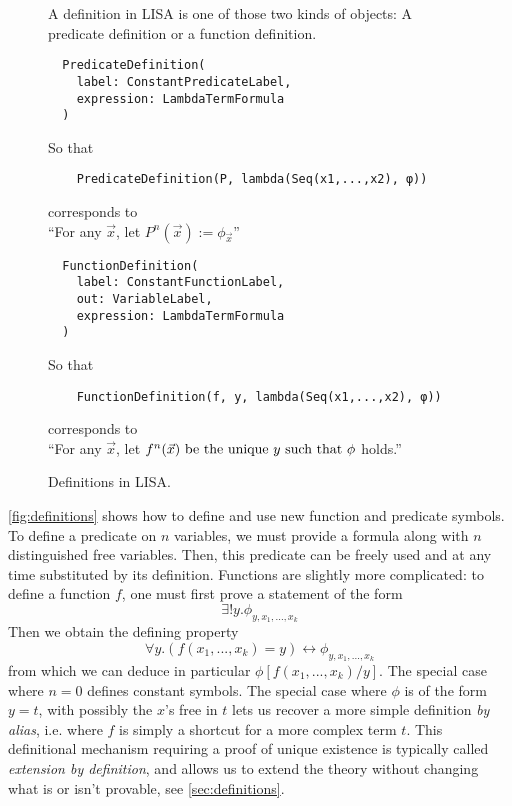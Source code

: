 \begin{figure}
  A definition in LISA is one of those two kinds of objects: A predicate definition or a function definition.
  \begin{lstlisting}
  PredicateDefinition(
    label: ConstantPredicateLabel,
    expression: LambdaTermFormula
  )
\end{lstlisting}
  So that 
  \begin{lstlisting}
    PredicateDefinition(P, lambda(Seq(x1,...,x2), φ)) 
  \end{lstlisting}
  corresponds to \\
    \hspace*{1.3em}``For any $\vec{x}$, let $P^n(\vec{x}) := \phi_{\vec{x}}$''

    \vspace*{2em}
  \begin{lstlisting}
  FunctionDefinition(
    label: ConstantFunctionLabel,
    out: VariableLabel, 
    expression: LambdaTermFormula
  )
\end{lstlisting}
So that 
  \begin{lstlisting}
    FunctionDefinition(f, y, lambda(Seq(x1,...,x2), φ)) 
  \end{lstlisting}
  corresponds to \\
    \hspace*{1.3em}``For any $\vec{x}$, let $f^n(\vec{x}) \textnormal{ be the unique } y \textnormal{ such that } \phi$ holds.''

  \caption{Definitions in LISA.}
  \label{fig:definitions}
\end{figure}

\autoref{fig:definitions} shows how to define and use new function and predicate symbols. To define a predicate on $n$ variables, we must provide a formula along with $n$ distinguished free variables. Then, this predicate can be freely used and at any time substituted by its definition. Functions are slightly more complicated: to define a function $f$, one must first prove a statement of the form
$$\exists ! y. \phi_{y, x_1,...,x_k}$$
Then we obtain the defining property
$$\forall y. (f(x_1,...,x_k)=y) \leftrightarrow \phi_{y, x_1,...,x_k}$$
from which we can deduce in particular $\phi[f(x_1,...,x_k)/y]$.
The special case where $n=0$ defines constant symbols. The special case where $\phi$ is of the form $y=t$, with possibly the $x$'s free in $t$ lets us recover a more simple definition \textit{by alias}, i.e. where  $f$ is simply a shortcut for a more complex term $t$.
This definitional mechanism requiring a proof of unique existence is typically called \textit{extension by definition}, and allows us to extend the theory without changing what is or isn't provable, see \autoref{sec:definitions}.


